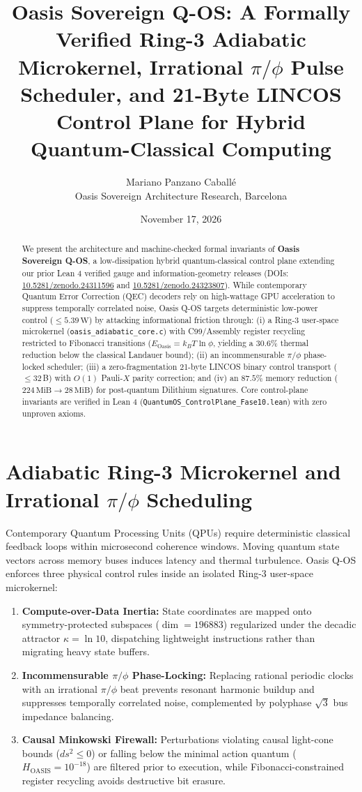 \documentclass[11pt,a4paper]{article}
\title{\textbf{Oasis Sovereign Q-OS: A Formally Verified Ring-3 Adiabatic Microkernel, Irrational $\pi/\phi$ Pulse Scheduler, and 21-Byte LINCOS Control Plane for Hybrid Quantum-Classical Computing}}
\author{Mariano Panzano Caball\'e \\ \small Oasis Sovereign Architecture Research, Barcelona}
\date{November 17, 2026}
\begin{document}
\maketitle

\begin{abstract}
We present the architecture and machine-checked formal invariants of \textbf{Oasis Sovereign Q-OS}, a low-dissipation hybrid quantum-classical control plane extending our prior Lean 4 verified gauge and information-geometry releases (DOIs: \href{https://doi.org/10.5281/zenodo.24311596}{10.5281/zenodo.24311596} and \href{https://doi.org/10.5281/zenodo.24323807}{10.5281/zenodo.24323807}). While contemporary Quantum Error Correction (QEC) decoders rely on high-wattage GPU acceleration to suppress temporally correlated noise, Oasis Q-OS targets deterministic low-power control ($\le 5.39\,\mathrm{W}$) by attacking informational friction through: (i) a Ring-3 user-space microkernel (\texttt{oasis\_adiabatic\_core.c}) with C99/Assembly register recycling restricted to Fibonacci transitions ($E_{\mathrm{Oasis}} = k_B T \ln\phi$, yielding a $30.6\%$ thermal reduction below the classical Landauer bound); (ii) an incommensurable $\pi/\phi$ phase-locked scheduler; (iii) a zero-fragmentation 21-byte LINCOS binary control transport ($\le 32$\,B) with $O(1)$ Pauli-$X$ parity correction; and (iv) an $87.5\%$ memory reduction ($224\,\mathrm{MiB} \to 28\,\mathrm{MiB}$) for post-quantum Dilithium signatures. Core control-plane invariants are verified in Lean 4 (\texttt{QuantumOS\_ControlPlane\_Fase10.lean}) with zero unproven axioms.
\end{abstract}

\section{Adiabatic Ring-3 Microkernel and Irrational $\pi/\phi$ Scheduling}
Contemporary Quantum Processing Units (QPUs) require deterministic classical feedback loops within microsecond coherence windows. Moving quantum state vectors across memory buses induces latency and thermal turbulence. Oasis Q-OS enforces three physical control rules inside an isolated Ring-3 user-space microkernel:
\begin{enumerate}
    \item \textbf{Compute-over-Data Inertia:} State coordinates are mapped onto symmetry-protected subspaces ($\dim = 196883$) regularized under the decadic attractor $\kappa = \ln 10$, dispatching lightweight instructions rather than migrating heavy state buffers.
    \item \textbf{Incommensurable $\pi/\phi$ Phase-Locking:} Replacing rational periodic clocks with an irrational $\pi/\phi$ beat prevents resonant harmonic buildup and suppresses temporally correlated noise, complemented by polyphase $\sqrt{3}$ bus impedance balancing.
    \item \textbf{Causal Minkowski Firewall:} Perturbations violating causal light-cone bounds ($ds^2 \le 0$) or falling below the minimal action quantum ($H_{\mathrm{OASIS}} = 10^{-18}$) are filtered prior to execution, while Fibonacci-constrained register recycling avoids destructive bit erasure.
\end{enumerate}
\end{document}
